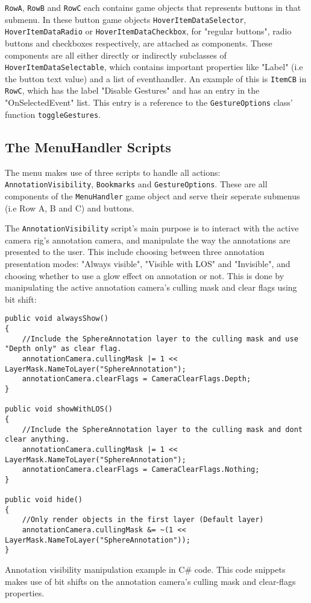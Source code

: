 \texttt{RowA}, \texttt{RowB} and \texttt{RowC} each contains game objects that represents buttons in that submenu. 
In these button game objects \texttt{HoverItemDataSelector}, \texttt{HoverItemDataRadio} or \texttt{HoverItemDataCheckbox}, for "regular buttons", radio buttons and 
checkboxes respectively, are attached as components. These components are all either directly or indirectly subclasses of \texttt{HoverItemDataSelectable}, which 
contains important properties like "Label" (i.e the button text value) and a list of eventhandler. An example of this is \texttt{ItemCB} in \texttt{RowC}, which has 
the label "Disable Gestures" and has an entry in the "OnSelectedEvent" list. This entry is a reference to the \texttt{GestureOptions} class' function \texttt{toggleGestures}. 

\subsection{The MenuHandler Scripts}
The menu makes use of three scripts to handle all actions: \texttt{AnnotationVisibility}, \texttt{Bookmarks} and \texttt{GestureOptions}.
These are all components of the \texttt{MenuHandler} game object and serve their seperate submenus (i.e Row A, B and C) and buttons. 

The \texttt{AnnotationVisibility} script's main purpose is to interact with the active camera rig's annotation camera, and manipulate the way
the annotations are presented to the user. This include choosing between three annotation presentation modes: "Always visible", "Visible with LOS" and 
"Invisible", and choosing whether to use a glow effect on annotation or not. This is done by manipulating the active annotation camera's culling mask 
and clear flags using bit shift:

\begin{table}
\label{table:annotation_visibility_code}
\lstset{style=csharp}
\begin{lstlisting}
public void alwaysShow()
{
	//Include the SphereAnnotation layer to the culling mask and use "Depth only" as clear flag.
	annotationCamera.cullingMask |= 1 << LayerMask.NameToLayer("SphereAnnotation");
	annotationCamera.clearFlags = CameraClearFlags.Depth;
}

public void showWithLOS()
{
	//Include the SphereAnnotation layer to the culling mask and dont clear anything.
	annotationCamera.cullingMask |= 1 << LayerMask.NameToLayer("SphereAnnotation");
	annotationCamera.clearFlags = CameraClearFlags.Nothing;
}

public void hide()
{
	//Only render objects in the first layer (Default layer)
	annotationCamera.cullingMask &= ~(1 << LayerMask.NameToLayer("SphereAnnotation"));
}
\end{lstlisting}
\caption[Annotation visibility manipulation]{Annotation visibility manipulation example in C\# code. This code snippets makes use of 
		bit shifts on the annotation camera's culling mask and clear-flags properties.} 
\end{table}

